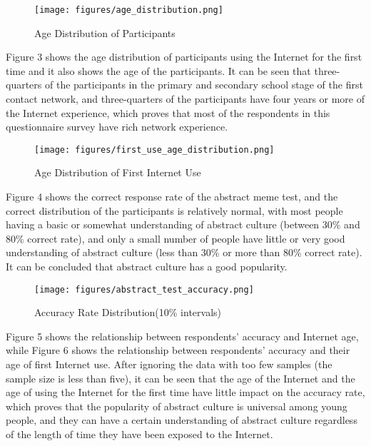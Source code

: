 \documentclass[12pt,a4paper]{ctexart}
\begin{document}
\begin{figure}[htbp]
    \centering
    \texttt{[image: figures/age\_distribution.png]}
    \caption{Age Distribution of Participants}
    \label{fig:age_distribution}
\end{figure}

Figure 3 shows the age distribution of participants using the Internet for the first time and it also shows the age of the participants. It can be seen that three-quarters of the participants in the primary and secondary school stage of the first contact network, and three-quarters of the participants have four years or more of the Internet experience, which proves that most of the respondents in this questionnaire survey have rich network experience.

\begin{figure}[htbp]
    \centering
    \texttt{[image: figures/first\_use\_age\_distribution.png]}
    \caption{Age Distribution of First Internet Use}
    \label{fig:first_use_age_distribution}
\end{figure}

Figure 4 shows the correct response rate of the abstract meme test, and the correct distribution of the participants is relatively normal, with most people having a basic or somewhat understanding of abstract culture (between 30\% and 80\% correct rate), and only a small number of people have little or very good understanding of abstract culture (less than 30\% or more than 80\% correct rate). It can be concluded that abstract culture has a good popularity.

\begin{figure}[htbp]
    \centering
    \texttt{[image: figures/abstract\_test\_accuracy.png]}
    \caption{Accuracy Rate Distribution(10\% intervals)}
    \label{fig:abstract_test_accuracy}
\end{figure}

Figure 5 shows the relationship between respondents' accuracy and Internet age, while Figure 6 shows the relationship between respondents' accuracy and their age of first Internet use. After ignoring the data with too few samples (the sample size is less than five), it can be seen that the age of the Internet and the age of using the Internet for the first time have little impact on the accuracy rate, which proves that the popularity of abstract culture is universal among young people, and they can have a certain understanding of abstract culture regardless of the length of time they have been exposed to the Internet.
\end{document}
